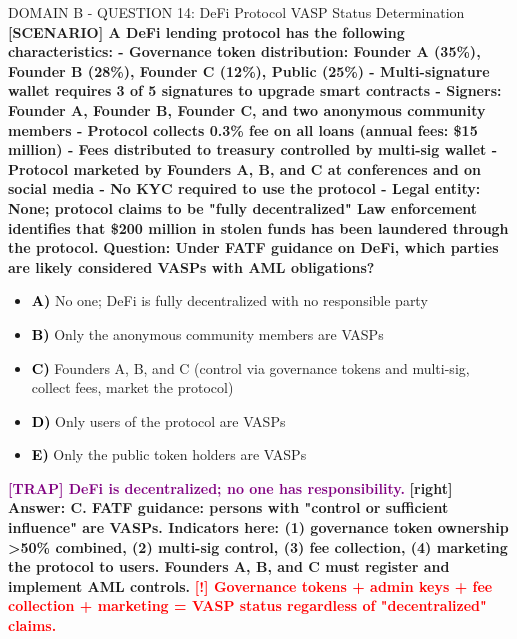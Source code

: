 \documentclass[11pt,a4paper]{beamer}
\newcommand{\redflag}[1]{\textcolor{red}{\textbf{[!] #1}}}
\newcommand{\trap}[1]{\textcolor{purple}{\textbf{[TRAP] #1}}}
\newcommand{\correct}[1]{\textcolor{green!50!black}{\textbf{[right] #1}}}
\newcommand{\scenario}[1]{\textcolor{blue!70!black}{\textbf{[SCENARIO] #1}}}
\newcommand{\option}[1]{\textcolor{black}{\textbf{#1}}}
\begin{document}
\begin{frame}{DOMAIN B - QUESTION 14: DeFi Protocol VASP Status Determination}
\scenario{A DeFi lending protocol has the following characteristics:
- Governance token distribution: Founder A (35\%), Founder B (28\%), Founder C (12\%), Public (25\%)
- Multi-signature wallet requires 3 of 5 signatures to upgrade smart contracts
- Signers: Founder A, Founder B, Founder C, and two anonymous community members
- Protocol collects 0.3\% fee on all loans (annual fees: \$15 million)
- Fees distributed to treasury controlled by multi-sig wallet
- Protocol marketed by Founders A, B, and C at conferences and on social media
- No KYC required to use the protocol
- Legal entity: None; protocol claims to be "fully decentralized"
Law enforcement identifies that \$200 million in stolen funds has been laundered through the protocol.}
\vspace{0.2cm}
\textbf{Question: Under FATF guidance on DeFi, which parties are likely considered VASPs with AML obligations?}
\vspace{0.1cm}
\begin{itemize}
    \item \option{A)} No one; DeFi is fully decentralized with no responsible party
    \item \option{B)} Only the anonymous community members are VASPs
    \item \option{C)} Founders A, B, and C (control via governance tokens and multi-sig, collect fees, market the protocol)
    \item \option{D)} Only users of the protocol are VASPs
    \item \option{E)} Only the public token holders are VASPs
\end{itemize}
\vspace{0.2cm}
\trap{DeFi is decentralized; no one has responsibility.}
\correct{Answer: C. FATF guidance: persons with "control or sufficient influence" are VASPs. Indicators here: (1) governance token ownership >50\% combined, (2) multi-sig control, (3) fee collection, (4) marketing the protocol to users. Founders A, B, and C must register and implement AML controls.}
\redflag{Governance tokens + admin keys + fee collection + marketing = VASP status regardless of "decentralized" claims.}
\end{frame}
\end{document}
